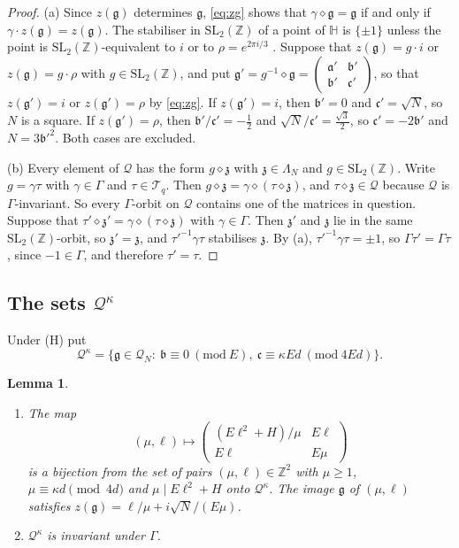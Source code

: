 \documentclass[11pt]{amsart}
\newtheorem{lemma}[theorem]{Lemma}
\theoremstyle{remark}
\theoremstyle{definition}
\numberwithin{equation}{section}
\newcommand{\Qc}{\mathcal{Q}}
\newcommand{\Tc}{\mathcal{T}}
\newcommand{\Z}{\mathbb{Z}}
\newcommand{\Hb}{\mathbb{H}}
\newcommand{\ga}{\mathfrak{a}}
\newcommand{\gb}{\mathfrak{b}}
\newcommand{\gc}{\mathfrak{c}}
\newcommand{\fg}{\mathfrak{g}}
\newcommand{\gz}{\mathfrak{z}}
\newcommand{\SL}{\mathrm{SL}}
\begin{document}
\begin{proof}
(a) Since $z(\fg)$ determines $\fg$, \eqref{eq:zg} shows that $\gamma\diamond\fg=\fg$ if and only if $\gamma\cdot z(\fg)=z(\fg)$. The stabiliser in $\SL_2(\Z)$ of a point of $\Hb$ is $\{\pm1\}$ unless the point is $\SL_2(\Z)$-equivalent to $i$ or to $\rho=e^{2\pi i/3}$ \cite[Ch.~VII, Theorem~1]{Se}. Suppose that $z(\fg)=g\cdot i$ or $z(\fg)=g\cdot\rho$ with $g\in\SL_2(\Z)$, and put $\fg'=g^{-1}\diamond\fg=\left(\begin{smallmatrix}\ga'&\gb'\\ \gb'&\gc'\end{smallmatrix}\right)$, so that $z(\fg')=i$ or $z(\fg')=\rho$ by \eqref{eq:zg}. If $z(\fg')=i$, then $\gb'=0$ and $\gc'=\sqrt N$, so $N$ is a square. If $z(\fg')=\rho$, then $\gb'/\gc'=-\frac12$ and $\sqrt N/\gc'=\frac{\sqrt3}2$, so $\gc'=-2\gb'$ and $N=3\gb'^2$. Both cases are excluded.

(b) Every element of $\Qc$ has the form $g\diamond\gz$ with $\gz\in\Lambda_N$ and $g\in\SL_2(\Z)$. Write $g=\gamma\tau$ with $\gamma\in\Gamma$ and $\tau\in\Tc_q$. Then $g\diamond\gz=\gamma\diamond(\tau\diamond\gz)$, and $\tau\diamond\gz\in\Qc$ because $\Qc$ is $\Gamma$-invariant. So every $\Gamma$-orbit on $\Qc$ contains one of the matrices in question. Suppose that $\tau'\diamond\gz'=\gamma\diamond(\tau\diamond\gz)$ with $\gamma\in\Gamma$. Then $\gz'$ and $\gz$ lie in the same $\SL_2(\Z)$-orbit, so $\gz'=\gz$, and $\tau'^{-1}\gamma\tau$ stabilises $\gz$. By (a), $\tau'^{-1}\gamma\tau=\pm1$, so $\Gamma\tau'=\Gamma\tau$, since $-1\in\Gamma$, and therefore $\tau'=\tau$.
\end{proof}

\subsection{\texorpdfstring{The sets $\Qc^\kappa$}{The sets Q\^{}kappa}}
Under \textup{(H)} put
\[
\Qc^\kappa=\{\fg\in\Qc_N:\ \gb\equiv0\ (\mathrm{mod}\ E),\ \gc\equiv\kappa Ed\ (\mathrm{mod}\ 4Ed)\}.
\]

\begin{lemma}\label{lem:Qkappa}
\begin{enumerate}
\item[(a)] The map
\[
(\mu,\ell)\longmapsto\begin{pmatrix}(E\ell^2+H)/\mu&E\ell\\E\ell&E\mu\end{pmatrix}
\]
is a bijection from the set of pairs $(\mu,\ell)\in\Z^2$ with $\mu\ge1$, $\mu\equiv\kappa d\pmod{4d}$ and $\mu\mid E\ell^2+H$ onto $\Qc^\kappa$. The image $\fg$ of $(\mu,\ell)$ satisfies $z(\fg)=\ell/\mu+i\sqrt N/(E\mu)$.
\item[(b)] $\Qc^\kappa$ is invariant under $\Gamma$.
\end{enumerate}
\end{lemma}
\end{document}
